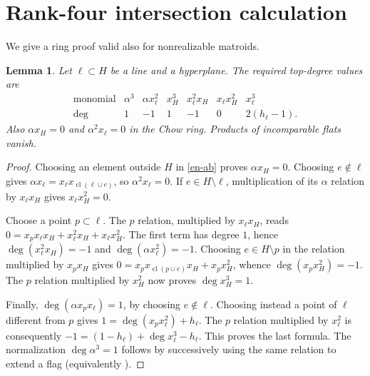 \documentclass[12pt]{amsart}
\newtheorem{lem}[thm]{Lemma}
\theoremstyle{definition}
\theoremstyle{remark}
\numberwithin{equation}{section}
\begin{document}
\section{Rank-four intersection calculation}
We give a ring proof valid also for nonrealizable matroids.
\begin{lem}\label{en-monomials}
Let $\ell\subset H$ be a line and a hyperplane. The required top-degree values are
\[
\begin{array}{c|rrrrrr}
\text{monomial}&\alpha^3&\alpha x_\ell^2&x_H^3&x_\ell^2x_H&x_\ell x_H^2&x_\ell^3\\\hline
\deg&1&-1&1&-1&0&2(h_\ell-1).
\end{array}
\]
Also $\alpha x_H=0$ and $\alpha^2x_\ell=0$ in the Chow ring. Products of incomparable flats vanish.
\end{lem}
\begin{proof}
Choosing an element outside $H$ in \eqref{en-ab} proves $\alpha x_H=0$. Choosing $e\notin\ell$ gives $\alpha x_\ell=x_\ell x_{\operatorname{cl}(\ell\cup e)}$, so $\alpha^2x_\ell=0$. If $e\in H\setminus\ell$, multiplication of its $\alpha$ relation by $x_\ell x_H$ gives $x_\ell x_H^2=0$.

Choose a point $p\subset\ell$. The $p$ relation, multiplied by $x_\ell x_H$, reads
$0=x_px_\ell x_H+x_\ell^2x_H+x_\ell x_H^2$.
The first term has degree $1$, hence $\deg(x_\ell^2x_H)=-1$ and $\deg(\alpha x_\ell^2)=-1$.
Choosing $e\in H\setminus p$ in the relation multiplied by $x_px_H$ gives $0=x_px_{\operatorname{cl}(p\cup e)}x_H+x_px_H^2$, whence $\deg(x_px_H^2)=-1$. The $p$ relation multiplied by $x_H^2$ now proves $\deg x_H^3=1$.

Finally, $\deg(\alpha x_px_\ell)=1$, by choosing $e\notin\ell$. Choosing instead a point of $\ell$ different from $p$ gives
$1=\deg(x_px_\ell^2)+h_\ell$.
The $p$ relation multiplied by $x_\ell^2$ is consequently
$-1=(1-h_\ell)+\deg x_\ell^3-h_\ell$.
This proves the last formula. The normalization $\deg\alpha^3=1$ follows by successively using the same relation to extend a flag (equivalently \cite[Proposition 5.8]{AHK}).
\end{proof}
\end{document}
